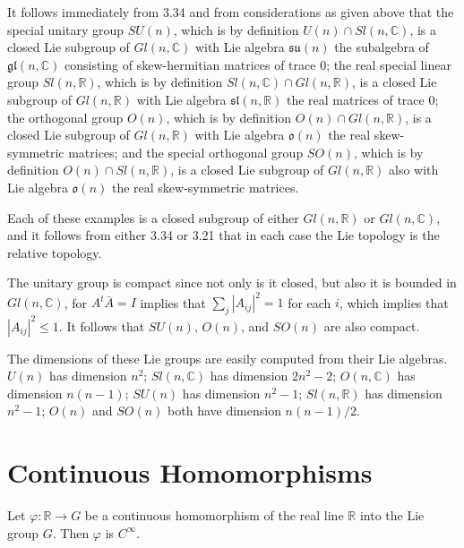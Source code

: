 It follows immediately from 3.34 and from considerations as given above that the special unitary group $SU(n)$, which is by definition $U(n)\cap Sl(n,\mathbb{C})$, is a closed Lie subgroup of $Gl(n,\mathbb{C})$ with Lie algebra $\mathfrak{su}(n)$ the subalgebra of $\mathfrak{gl}(n,\mathbb{C})$ consisting of skew-hermitian matrices of trace $0$; the real special linear group $Sl(n,\mathbb{R})$, which is by definition $Sl(n,\mathbb{C})\cap Gl(n,\mathbb{R})$, is a closed Lie subgroup of $Gl(n,\mathbb{R})$ with Lie algebra $\mathfrak{sl}(n,\mathbb{R})$ the real matrices of trace $0$; the orthogonal group $O(n)$, which is by definition $O(n)\cap Gl(n,\mathbb{R})$, is a closed Lie subgroup of $Gl(n,\mathbb{R})$ with Lie algebra $\mathfrak{o}(n)$ the real skew-symmetric matrices; and the special orthogonal group $SO(n)$, which is by definition $O(n)\cap Sl(n,\mathbb{R})$, is a closed Lie subgroup of $Gl(n,\mathbb{R})$ also with Lie algebra $\mathfrak{o}(n)$ the real skew-symmetric matrices. 

Each of these examples is a closed subgroup of either $Gl(n,\mathbb{R})$ or $Gl(n,\mathbb{C})$, and it follows from either 3.34 or 3.21 that in each case the Lie topology is the relative topology.

The unitary group is compact since not only is it closed, but also it is bounded in $Gl(n,\mathbb{C})$, for $A^t\bar{A}=I$ implies that $\sum_j|A_{ij}|^{2}=1$ for each $i$, which implies that $|A_{ij}|^{2}\leq1$. It follows that $SU(n)$, $O(n)$, and $SO(n)$ are also compact.

The dimensions of these Lie groups are easily computed from their Lie algebras. $U(n)$ has dimension $n^2$; $Sl(n,\mathbb{C})$ has dimension $2n^2 - 2$; $O(n,\mathbb{C})$ has dimension $n(n - 1)$; $SU(n)$ has dimension $n^2 - 1$; $Sl(n,\mathbb{R})$ has dimension $n^2 - 1$; $O(n)$ and $SO(n)$ both have dimension $n(n - 1)/2$.

\section{Continuous Homomorphisms}

\begin{theorem}\label{thm:3.38}
Let $\varphi: \mathbb{R} \to G$ be a continuous homomorphism of the real line $\mathbb{R}$ into the Lie group $G$. Then $\varphi$ is $C^\infty$.

\end{theorem}

